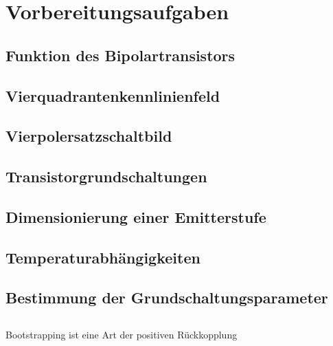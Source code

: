 \documentclass[a4paper, 12pt]{article}
\begin{document}
  
  \clearpage
  \setcounter{page}{1}

\section{Vorbereitungsaufgaben}

\subsection{Funktion des Bipolartransistors}


\subsection{Vierquadrantenkennlinienfeld}


\subsection{Vierpolersatzschaltbild}


\subsection{Transistorgrundschaltungen}


\subsection{Dimensionierung einer Emitterstufe}


\subsection{Temperaturabhängigkeiten}


\subsection{Bestimmung der Grundschaltungsparameter}


\subsection{}
Bootstrapping ist eine Art der positiven Rückkopplung
\end{document}
